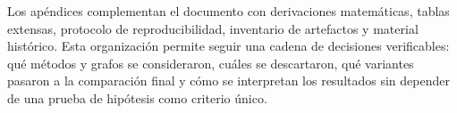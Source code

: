 Los apéndices complementan el documento con derivaciones matemáticas, tablas extensas, protocolo de reproducibilidad, inventario de artefactos y material histórico. Esta organización permite seguir una cadena de decisiones verificables: qué métodos y grafos se consideraron, cuáles se descartaron, qué variantes pasaron a la comparación final y cómo se interpretan los resultados sin depender de una prueba de hipótesis como criterio único.

